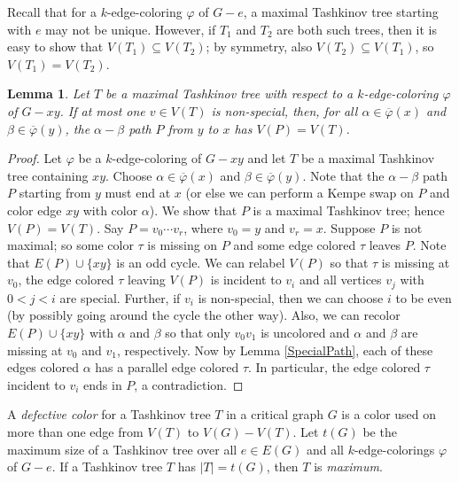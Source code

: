 \documentclass[12pt]{amsart}
\theoremstyle{plain}
\newtheorem{lem}[thm]{Lemma}
\theoremstyle{definition}
\theoremstyle{remark}
\newcommand{\vph}{\varphi}
\newcommand{\vphn}{\overline{\varphi}}
\begin{document}
Recall that for a $k$-edge-coloring $\vph$ of $G-e$, a maximal Tashkinov tree
starting with $e$ may not be unique.  However, if $T_1$ and $T_2$ are both such
trees, then it is easy to show that $V(T_1)\subseteq V(T_2)$; by symmetry, also
$V(T_2)\subseteq V(T_1)$, so $V(T_1)=V(T_2)$.

\begin{lem}
\label{lem1}
Let $T$ be a maximal Tashkinov tree with respect to a $k$-edge-coloring $\vph$
of $G-xy$.  If at most one $v \in V(T)$ is non-special, then, for all $\alpha \in \vphn(x)$
and $\beta \in \vphn(y)$, the $\alpha-\beta$ path $P$ from $y$
to $x$ has $V(P) = V(T)$.
\end{lem}
\begin{proof}
Let $\vph$ be a $k$-edge-coloring of $G-xy$ and let $T$ be a maximal Tashkinov
tree containing $xy$.  Choose $\alpha \in \vphn(x)$ and $\beta \in \vphn(y)$.
Note that the $\alpha-\beta$ path $P$ starting from $y$ must end at $x$ (or
else we can perform a Kempe swap on $P$ and color edge $xy$ with color $\alpha$).
We show that $P$ is a maximal Tashkinov tree; hence $V(P) = V(T)$.  Say $P =
v_0\cdots v_r$, where $v_0=y$ and $v_r = x$. 
Suppose $P$ is not maximal; so some color $\tau$ is missing on
$P$ and some edge colored $\tau$ leaves $P$.  
Note that $E(P)\cup\{xy\}$ is an odd cycle.
We can relabel $V(P)$ so that $\tau$ is missing at $v_0$, the edge 
colored $\tau$ leaving $V(P)$ is incident to $v_i$ and all vertices $v_j$ with
$0<j<i$ are special.  Further, if $v_i$ is non-special, then we
can choose $i$ to be even (by possibly going around the cycle the other way).
Also, we can recolor $E(P)\cup\{xy\}$ with $\alpha$ and $\beta$ so that only
$v_0v_1$ is uncolored and $\alpha$ and $\beta$ are missing at $v_0$ and $v_1$,
respectively.
Now by Lemma \ref{SpecialPath}, %
each of these edges colored $\alpha$ has a parallel edge colored $\tau$.  
In particular, the edge colored $\tau$ incident to $v_i$ ends in $P$, a
contradiction.
\end{proof}

A \emph{defective color} for a
Tashkinov tree $T$  in a critical graph $G$ is a color used on more than one edge
from $V(T)$ to $V(G) - V(T)$.  Let $t(G)$ be the maximum size of a Tashkinov tree over all $e \in E(G)$
and all $k$-edge-colorings $\vph$ of $G - e$.  If a Tashkinov tree $T$ has $|T| = t(G)$, then $T$ is \emph{maximum}.
\end{document}
